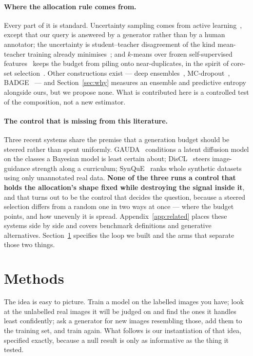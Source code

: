 \documentclass{article}
\begin{document}
\paragraph{Where the allocation rule comes from.} Every part of it is standard. Uncertainty sampling
comes from active learning~\citep{settles2009active}, except that our query is answered by a
generator rather than by a human annotator; the uncertainty is student--teacher disagreement of the
kind mean-teacher training already minimises~\citep{tarvainen2017mean}; and $k$-means over frozen
self-supervised features~\citep{oquab2024dinov2,radford2021learning} keeps the budget from piling
onto near-duplicates, in the spirit of core-set selection~\citep{sener2018active}. Other
constructions exist --- deep ensembles~\citep{lakshminarayanan2017simple},
MC-dropout~\citep{gal2016dropout}, BADGE~\citep{ash2020deep} --- and Section~\ref{sec:why} measures
an ensemble and predictive entropy alongside ours, but we propose none. What is contributed here is a controlled test of
the composition, not a new estimator.

\paragraph{The control that is missing from this literature.} Three recent systems share the premise
that a generation budget should be steered rather than spent uniformly.
GAUDA~\citep{frisch2025gauda} conditions a latent diffusion model on the classes a Bayesian model is
least certain about; DisCL~\citep{liang2025discl} steers image-guidance strength along a curriculum;
SynQuE~\citep{chen2025synque} ranks whole synthetic datasets using only unannotated real data.
\textbf{None of the three runs a control that holds the allocation's shape fixed while destroying
the signal inside it}, and that turns out to be the control that decides the question, because a
steered selection differs from a random one in two ways at once --- where the budget points, and how
unevenly it is spread. Appendix~\ref{app:related} places these systems side by side and covers
benchmark definitions and generative alternatives. Section~\ref{sec:method} specifies the loop we
built and the arms that separate those two things.

\section{Methods}
\label{sec:method}
The idea is easy to picture. Train a model on the labelled images you have; look at the unlabelled
real images it will be judged on and find the ones it handles least confidently; ask a generator for
new images resembling those, add them to the training set, and train again. What follows is our
instantiation of that idea, specified exactly, because a null result is only as informative as the
thing it tested.
\end{document}
